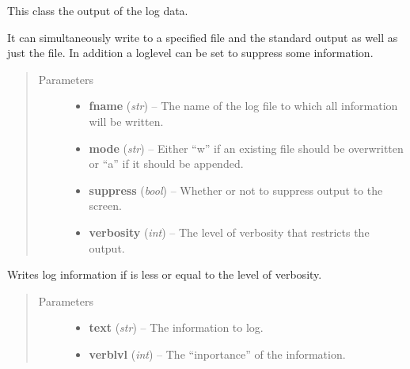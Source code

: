 \documentclass[letterpaper,10pt,english]{sphinxmanual}
\begin{document}
\begin{fulllineitems}
\label{pytrajectory:pytrajectory.log.Logger}
This class the output of the log data.

It can simultaneously write to a specified file and the standard output as well as just the
file. In addition a loglevel can be set to suppress some information.
\begin{quote}\begin{description}
\item[{Parameters}] \leavevmode\begin{itemize}
\item {} 
\textbf{fname} (\emph{str}) -- The name of the log file to which all information will be written.

\item {} 
\textbf{mode} (\emph{str}) -- Either ``w'' if an existing file should be overwritten or ``a'' if it should be appended.

\item {} 
\textbf{suppress} (\emph{bool}) -- Whether or not to suppress output to the screen.

\item {} 
\textbf{verbosity} (\emph{int}) -- The level of verbosity that restricts the output.

\end{itemize}

\end{description}\end{quote}

\begin{fulllineitems}
\label{pytrajectory:pytrajectory.log.Logger.write}
Writes log information if  is less or equal to the level of verbosity.
\begin{quote}\begin{description}
\item[{Parameters}] \leavevmode\begin{itemize}
\item {} 
\textbf{text} (\emph{str}) -- The information to log.

\item {} 
\textbf{verblvl} (\emph{int}) -- The ``inportance'' of the information.

\end{itemize}

\end{description}\end{quote}

\end{fulllineitems}


\end{fulllineitems}
\end{document}
